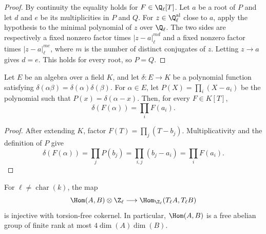 \begin{proof}
By continuity the equality holds for $F\in\Q_\ell[T]$.  Let $a$ be a root
of $P$ and let $d$ and $e$ be its multiplicities in $P$ and $Q$.  For
$z\in\Q_\ell^{\rm al}$ close to $a$, apply the hypothesis to the minimal
polynomial of $z$ over $\Q_\ell$.  The two sides are respectively a fixed
nonzero factor times $|z-a|_\ell^{md}$ and a fixed nonzero factor times
$|z-a|_\ell^{me}$, where $m$ is the number of distinct conjugates of $z$.
Letting $z\to a$ gives $d=e$.  This holds for every root, so $P=Q$.
\end{proof}

\begin{lemma}
\label{lem:milne-multiplicative-polynomial}

Let $E$ be an algebra over a field $K$, and let $\delta:E\to K$ be a
polynomial function satisfying $\delta(\alpha\beta)=\delta(\alpha)\delta(\beta)$.
For $\alpha\in E$, let $P(X)=\prod_i(X-a_i)$ be the polynomial such that
$P(x)=\delta(\alpha-x)$.  Then, for every $F\in K[T]$,
\[
\delta(F(\alpha))=\prod_iF(a_i).
\]
\end{lemma}

\begin{proof}
After extending $K$, factor $F(T)=\prod_j(T-b_j)$.  Multiplicativity and
the definition of $P$ give
\[
\delta(F(\alpha))=\prod_jP(b_j)=\prod_{i,j}(b_j-a_i)
 =\prod_iF(a_i).
\]
\end{proof}

\begin{theorem}
\label{thm:milne-hom-tate-injective}

For $\ell\ne\operatorname{char}(k)$, the map
\[
 \Hom(A,B)\otimes\Z_\ell\longrightarrow
 \Hom_{\Z_\ell}(T_\ell A,T_\ell B)
\]
is injective with torsion-free cokernel.  In particular,
$\Hom(A,B)$ is a free abelian group of finite rank at most
$4\dim(A)\dim(B)$.
\end{theorem}


